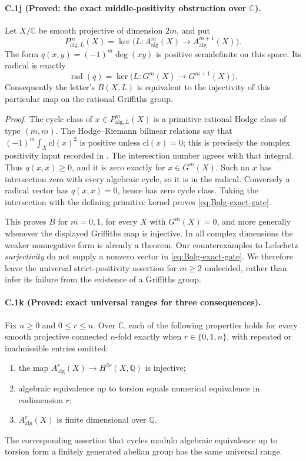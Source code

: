 \paragraph{C.1j (Proved: the exact middle-positivity obstruction over $\mathbb C$).}
Let $X/\mathbb C$ be smooth projective of dimension $2m$, and put
\[
 P^m_{\mathrm{alg},L}(X)
 =\ker\bigl(L:A^m_{\mathrm{alg}}(X)\longrightarrow
                         A^{m+1}_{\mathrm{alg}}(X)\bigr).
\]
The form $q(x,y)=(-1)^m\deg(xy)$ is positive semidefinite on this
space. Its radical is exactly
\begin{equation}\label{eq:Balg-exact-gate}
 \operatorname{rad}(q)=
 \ker\bigl(L:G^m(X)\longrightarrow G^{m+1}(X)\bigr).
\end{equation}
Consequently the letter's $B(X,L)$ is equivalent to the injectivity
of this particular map on the rational Griffiths group.

\emph{Proof.}
The cycle class of $x\in P^m_{\mathrm{alg},L}(X)$ is a primitive
rational Hodge class of type $(m,m)$. The Hodge--Riemann bilinear
relations say that $(-1)^m\int_X\mathrm{cl}(x)^2$ is positive
unless $\mathrm{cl}(x)=0$; this is precisely the complex positivity
input recorded in \citet[Remark 3.10, p.~380]{cyKleiman1968}.
The intersection number agrees with that integral. Thus $q(x,x)\ge0$,
and it is zero exactly for $x\in G^m(X)$. Such an $x$ has intersection
zero with every algebraic cycle, so it is in the radical. Conversely
a radical vector has $q(x,x)=0$, hence has zero cycle class. Taking
the intersection with the defining primitive kernel proves
\eqref{eq:Balg-exact-gate}.

This proves $B$ for $m=0,1$, for every $X$ with $G^m(X)=0$, and more
generally whenever the displayed Griffiths map is injective. In all
complex dimensions the weaker nonnegative form is already a theorem.
Our counterexamples to Lefschetz \emph{surjectivity} do not supply a
nonzero vector in \eqref{eq:Balg-exact-gate}. We therefore leave the
universal strict-positivity assertion for $m\ge2$ undecided, rather
than infer its failure from the existence of a Griffiths group.

\paragraph{C.1k (Proved: exact universal ranges for three consequences).}
Fix $n\ge0$ and $0\le r\le n$. Over $\mathbb C$, each of the following
properties holds for every smooth projective connected $n$-fold
exactly when $r\in\{0,1,n\}$, with repeated or inadmissible entries
omitted:
\begin{enumerate}
\item the map $A^r_{\mathrm{alg}}(X)\to H^{2r}(X,\mathbb Q)$ is
injective;
\item algebraic equivalence up to torsion equals numerical equivalence
in codimension $r$;
\item $A^r_{\mathrm{alg}}(X)$ is finite dimensional over $\mathbb Q$.
\end{enumerate}
The corresponding assertion that cycles modulo algebraic equivalence
up to torsion form a finitely generated abelian group has the same
universal range.

